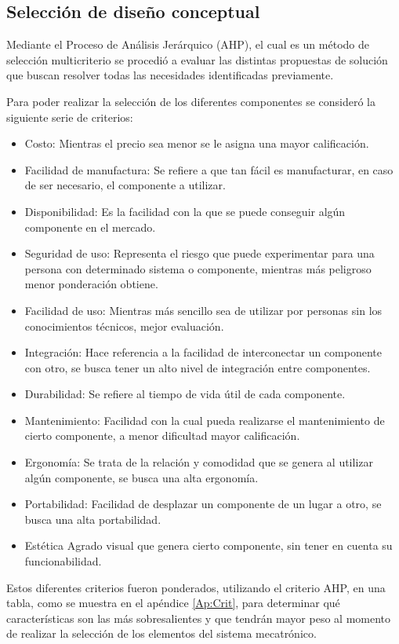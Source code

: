 \subsection{Selección de diseño conceptual}\label{SS:CritSel}

Mediante el Proceso de Análisis Jerárquico (AHP), el cual es un método de selección multicriterio se procedió a evaluar las distintas propuestas de solución que buscan resolver todas las necesidades identificadas previamente.

Para poder realizar la selección de los diferentes componentes se consideró la siguiente serie de criterios:

\begin{itemize}
    \item Costo:
    Mientras el precio sea menor se le asigna una mayor calificación.
    \item Facilidad de manufactura:
    Se refiere a que tan fácil es manufacturar, en caso de ser necesario, el componente a utilizar.
    \item Disponibilidad:
    Es la facilidad con la que se puede conseguir algún componente en el mercado.
    \item Seguridad de uso:
    Representa el riesgo que puede experimentar para una persona con determinado sistema o componente, mientras más peligroso menor ponderación obtiene.
    \item Facilidad de uso:
    Mientras más sencillo sea de utilizar por personas sin los conocimientos técnicos, mejor evaluación.
    \item Integración:
    Hace referencia a la facilidad de interconectar un componente con otro, se busca tener un alto nivel de integración entre componentes.
    \item Durabilidad:
    Se refiere al tiempo de vida útil de cada componente.
    \item Mantenimiento:
    Facilidad con la cual pueda realizarse el mantenimiento de cierto componente, a menor dificultad mayor calificación.
    \item Ergonomía:
    Se trata de la relación y comodidad que se genera al utilizar algún componente, se busca una alta ergonomía.
    \item Portabilidad:
    Facilidad de desplazar un componente de un lugar a otro, se busca una alta portabilidad.
    \item Estética
    Agrado visual que genera cierto componente, sin tener en cuenta su funcionabilidad.
\end{itemize}

Estos diferentes criterios fueron ponderados, utilizando el criterio AHP, en una tabla, como se muestra en el apéndice \ref{Ap:Crit}, para determinar qué características son las más sobresalientes y que tendrán mayor peso al momento de realizar la selección de los elementos del sistema mecatrónico.